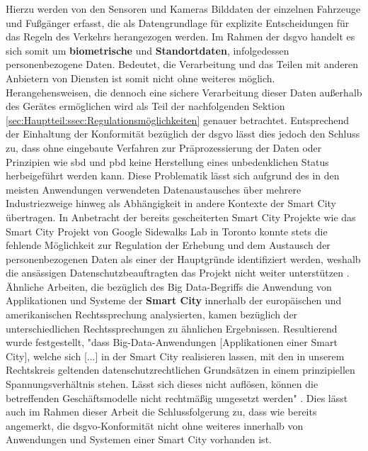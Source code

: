 Hierzu werden von den Sensoren und Kameras Bilddaten der einzelnen Fahrzeuge und Fußgänger erfasst, die als Datengrundlage für explizite Entscheidungen für das Regeln des Verkehrs herangezogen werden. Im Rahmen der \ac{dsgvo} handelt es sich somit um \textbf{biometrische} und \textbf{Standortdaten}, infolgedessen personenbezogene Daten. Bedeutet, die Verarbeitung und das Teilen mit anderen Anbietern von Diensten ist somit nicht ohne weiteres möglich. Herangehensweisen, die dennoch eine sichere Verarbeitung dieser Daten außerhalb des Gerätes ermöglichen wird als Teil der nachfolgenden Sektion \ref{sec:Hauptteil:ssec:Regulationsmöglichkeiten} genauer betrachtet. 
Entsprechend der Einhaltung der Konformität bezüglich der \ac{dsgvo} lässt dies jedoch den Schluss zu, dass ohne eingebaute Verfahren zur Präprozessierung der Daten oder Prinzipien wie \ac{sbd} und \ac{pbd} keine Herstellung eines unbedenklichen Status herbeigeführt werden kann. Diese Problematik lässt sich aufgrund des in den meisten Anwendungen verwendeten Datenaustausches über mehrere Industriezweige hinweg \cite{BCG2020} als Abhängigkeit in andere Kontexte der Smart City übertragen.
In Anbetracht der bereits gescheiterten Smart City Projekte wie das Smart City Projekt von Google Sidewalks Lab in Toronto \cite{SidewalkToronto2022} konnte stets die fehlende Möglichkeit zur Regulation der Erhebung und dem Austausch der personenbezogenen Daten als einer der Hauptgründe identifiziert werden, weshalb die ansässigen Datenschutzbeauftragten das Projekt nicht weiter unterstützen \cite{Bernier2022}.
Ähnliche Arbeiten, die bezüglich des Big Data-Begriffs die Anwendung von Applikationen und Systeme der \textbf{Smart City} innerhalb der europäischen und amerikanischen Rechtssprechung analysierten, kamen bezüglich der unterschiedlichen Rechtssprechungen zu ähnlichen Ergebnissen.
Resultierend wurde festgestellt, "dass Big-Data-Anwendungen [Applikationen einer Smart City], welche sich [...] in der Smart City realisieren lassen, mit den in unserem Rechtskreis geltenden datenschutzrechtlichen Grundsätzen in einem prinzipiellen Spannungsverhältnis stehen. Lässt sich dieses nicht auflösen, können die betreffenden Geschäftsmodelle nicht rechtmäßig umgesetzt werden" \cite{Sennhauser2019}.
Dies lässt auch im Rahmen dieser Arbeit die Schlussfolgerung zu, dass wie bereits angemerkt, die \ac{dsgvo}-Konformität nicht ohne weiteres innerhalb von Anwendungen und Systemen einer Smart City vorhanden ist.

